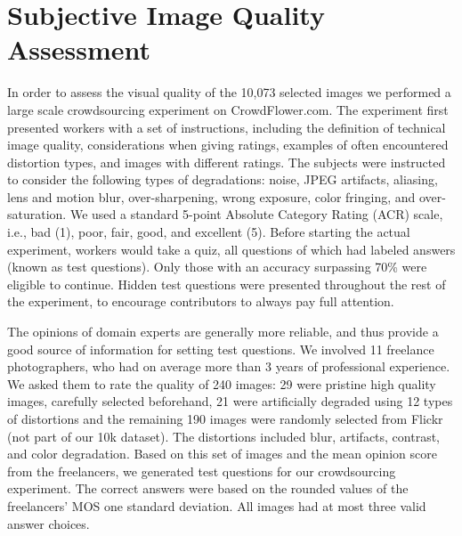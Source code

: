 \documentclass{article}
\begin{document}
\section{Subjective Image Quality Assessment} 




In order to assess the visual quality of the 10,073 selected images we performed a large scale crowdsourcing experiment on CrowdFlower.com. The experiment first presented workers with a set of instructions, including the definition of technical image quality, considerations when giving ratings, examples of often encountered distortion types, and images with different ratings. 
The subjects were instructed to consider the following types of degradations: noise, JPEG artifacts, aliasing, lens and motion blur, over-sharpening, wrong exposure, color fringing, and over-saturation.
We used a standard 5-point Absolute Category Rating (ACR) scale, i.e., bad (1), poor, fair, good, and excellent (5). Before starting the actual experiment, workers would take a quiz, all questions of which had labeled answers (known as test questions). Only those with an accuracy surpassing 70\% were eligible to continue. Hidden test questions were presented throughout the rest of the experiment, to encourage contributors to always pay full attention. 

The opinions of domain experts are generally more reliable, and thus provide a good source of information for setting test questions. We involved 11 freelance photographers, who had on average more than 3 years of professional experience. We asked them to rate the quality of 240 images: 29 were pristine high quality images, carefully selected beforehand, 21 were artificially degraded using 12 types of distortions and the remaining 190 images were randomly selected from Flickr (not part of our 10k dataset). The distortions included blur, artifacts, contrast, and color degradation. Based on this set of images and the mean opinion score from the freelancers, we generated test questions for our crowdsourcing experiment. The correct answers were based on the rounded values of the freelancers' MOS  one standard deviation. All images had at most three valid answer choices.
\end{document}
